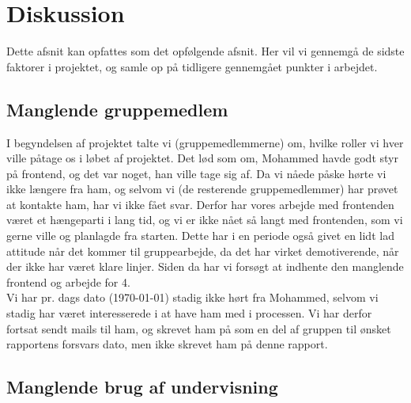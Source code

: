 \documentclass[]{article}
\begin{document}
\section{Diskussion} \label{Diskussion} %
Dette afsnit kan opfattes som det opfølgende afsnit. Her vil vi gennemgå de sidste faktorer i projektet, og samle op på tidligere gennemgået punkter i arbejdet. 

\subsection{Manglende gruppemedlem}

I begyndelsen af projektet talte vi (gruppemedlemmerne) om, hvilke roller vi hver ville påtage os i løbet af projektet. Det lød som om, Mohammed havde godt styr på frontend, og det var noget, han ville tage sig af. Da vi nåede påske hørte vi ikke længere fra ham, og selvom vi (de resterende gruppemedlemmer) har prøvet at kontakte ham, har vi ikke fået svar. Derfor har vores arbejde med frontenden været et hængeparti i lang tid, og vi er ikke nået så langt med frontenden, som vi gerne ville og planlagde fra starten. Dette har i en periode også givet en lidt lad attitude når det kommer til gruppearbejde, da det har virket demotiverende, når der ikke har været klare linjer. Siden da har vi forsøgt at indhente den manglende frontend og arbejde for 4. \\
Vi har pr. dags dato (\today) stadig ikke hørt fra Mohammed, selvom vi stadig har været interesserede i at have ham med i processen. Vi har derfor fortsat sendt mails til ham, og skrevet ham på som en del af gruppen til ønsket rapportens forsvars dato, men ikke skrevet ham på denne rapport.

\subsection{Manglende brug af undervisning}
\end{document}
